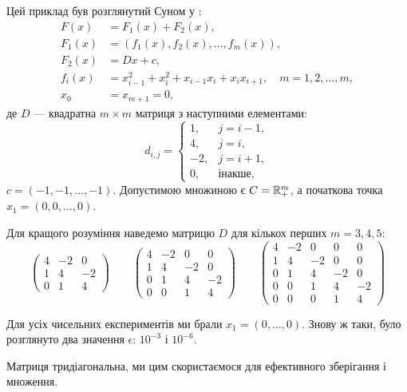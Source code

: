 Цей приклад був розглянутий Суном у \cite{sun}:
\begin{equation}
    \begin{aligned}
        F(x) &= F_1(x) + F_2(x), \\
        F_1(x) &= (f_1(x), f_2(x), \dots, f_m(x)), \\
        F_2(x) &= D x + c, \\
        f_i(x) &= x_{i - 1}^2 + x_i^2 + x_{i - 1} x_i + x_i x_{i + 1}, \quad m = 1, 2, \dots, m, \\
        x_0 &= x_{m + 1} = 0,
    \end{aligned}
\end{equation}
де $D$ --- квадратна $m \times m$ матриця з наступними елементами:
\begin{equation}
    d_{i,j} = \begin{cases}
         1, & j = i - 1, \\
         4, & j = i, \\
        -2, & j = i + 1, \\
         0, & \text{інакше},
    \end{cases}
\end{equation}
$c = (-1, -1, \dots, -1)$. Допустимою множиною є $C = \mathbb{R}_+^m$, а початкова точка $x_1 = (0, 0, \dots, 0)$. \medskip

Для кращого розуміння наведемо матрицю $D$ для кількох перших $m = 3, 4, 5$:
\begin{equation}
    \begin{pmatrix}
        4 & -2 &  0 \\
        1 &  4 & -2 \\
        0 &  1 &  4
    \end{pmatrix}
    \qquad
    \begin{pmatrix}
        4 & -2 &  0 &  0 \\
        1 &  4 & -2 &  0 \\
        0 &  1 &  4 & -2 \\
        0 &  0 &  1 &  4
    \end{pmatrix}
    \qquad
    \begin{pmatrix}
        4 & -2 &  0 &  0 &  0 \\
        1 &  4 & -2 &  0 &  0 \\
        0 &  1 &  4 & -2 &  0 \\
        0 &  0 &  1 &  4 & -2 \\
        0 &  0 &  0 &  1 &  4
    \end{pmatrix}
\end{equation}

Для усіх чисельних експериментів ми брали $x_1 = (0, \dots, 0)$. Знову ж таки, було розглянуто два значення $\epsilon$: $10^{-3}$ і $10^{-6}$.

\begin{remark}
    Матриця тридіагональна, ми цим скористаємося для ефективного зберігання і множення.
\end{remark}

